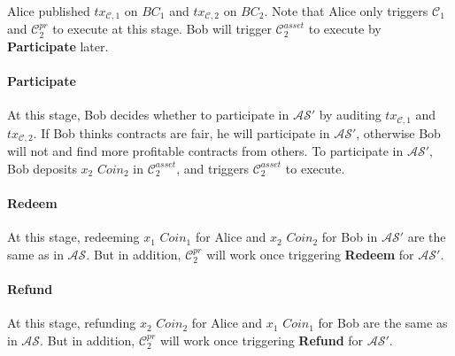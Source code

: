 Alice published $tx_{\mathcal{C}, 1}$ on $BC_1$ and $tx_{\mathcal{C}, 2}$ on $BC_2$.
Note that Alice only triggers $\mathcal{C}_1$ and $\mathcal{C}^{pr}_2$ to execute at this stage.
Bob will trigger $\mathcal{C}^{asset}_2$ to execute by \textbf{Participate} later.

\paragraph{\textbf{Participate}}
At this stage, Bob decides whether to participate in $\mathcal{AS}'$ by auditing $tx_{\mathcal{C}, 1}$ and $tx_{\mathcal{C}, 2}$.
If Bob thinks contracts are fair, he will participate in $\mathcal{AS}'$, otherwise Bob will not and find more profitable contracts from others.
To participate in $\mathcal{AS}'$, Bob deposits $x_2$ $Coin_2$ in $\mathcal{C}^{asset}_2$, and triggers $\mathcal{C}^{asset}_2$ to execute.

\paragraph{\textbf{Redeem}}
At this stage, redeeming $x_1$ $Coin_1$ for Alice and $x_2$ $Coin_2$ for Bob in $\mathcal{AS}'$ are the same as in $\mathcal{AS}$.
But in addition, $\mathcal{C}^{pr}_2$ will work once triggering \textbf{Redeem} for $\mathcal{AS}'$.

\paragraph{\textbf{Refund}}
At this stage, refunding $x_2$ $Coin_2$ for Alice and $x_1$ $Coin_1$ for Bob are the same as in $\mathcal{AS}$.
But in addition, $\mathcal{C}^{pr}_2$ will work once triggering \textbf{Refund} for $\mathcal{AS}'$.